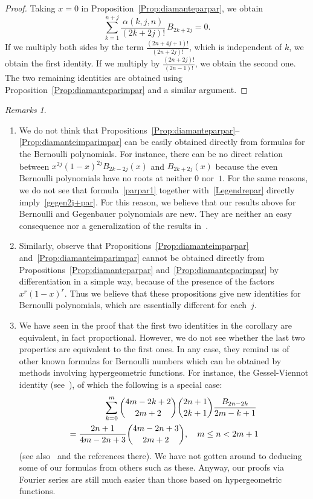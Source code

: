 \documentclass[a4paper,reqno]{amsart}
\theoremstyle{plain}
\numberwithin{equation}{section}
\theoremstyle{remark}
\newtheorem*{Notas}{Remarks}
\begin{document}
\begin{proof}
Taking $x = 0$ in Proposition~\ref{Prop:diamanteparpar}, we obtain
\[
  \sum_{k=1}^{n+j} \frac{\alpha(k,j,n)}{(2k+2j)!}\,B_{2k+2j} = 0.
\]
If we multiply both sides by the term $\frac{(2n+4j+1)!}{(2n+2j)!}$, which is independent of $k$, 
we obtain the first identity. If we multiply by $\frac{(2n+2j)!}{(2n-1)!}$, we obtain the second one. The two remaining identities are obtained using Proposition~\ref{Prop:diamanteparimpar} and a similar argument.
\end{proof}

\begin{Notas}\quad
\begin{enumerate}
\item[(i)] We do not think that Propositions~\ref{Prop:diamanteparpar}--\ref{Prop:diamanteimparimpar} can be easily obtained directly from formulas for the Bernoulli polynomials. For instance, there can be no direct relation between $x^{2j} (1-x)^{2j} B_{2k-2j}(x)$ and $B_{2k+2j}(x)$ because the even Bernoulli polynomials have no roots at neither $0$ nor~$1$. For the same reasons, we do not see that formula~\eqref{parpar1} together with~\eqref{Legendrepar} directly imply~\eqref{gegen2j+par}. For this reason, we believe that our results above for Bernoulli and Gegenbauer polynomials are new. They are neither an easy consequence nor a generalization of the results in~\cite{VuNg-Z,VuNg-B}.

\item[(ii)] Similarly, observe that Propositions~\ref{Prop:diamanteimparpar} and~\ref{Prop:diamanteimparimpar} cannot be obtained directly from Propositions~\ref{Prop:diamanteparpar} and~\ref{Prop:diamanteparimpar} by differentiation in a simple way, because of the presence of the factors $x^r (1-x)^r$. Thus we believe that these propositions give new identities for Bernoulli polynomials, which are essentially different for each~$j$.

\item[(iii)] We have seen in the proof that the first two identities in the corollary are equivalent, in fact proportional. However, we do not see whether the last two properties are equivalent to the first ones. In any case, they remind us of other known formulas for Bernoulli numbers which can be obtained by methods involving hypergeometric functions. For instance, the Gessel-Viennot identity (see~\cite{GesVien}), of which the following is a special case:
\begin{multline*}
\qquad\qquad
  \sum_{k=0}^{m} \dbinom{4m-2k+2}{2m+2} \dbinom{2n+1}{2k+1} \frac{B_{2n-2k}}{2m-k+1}
  \\*
  = \frac{2n+1}{4m-2n+3} \dbinom{4m-2n+3}{2m+2},
  \quad m\leq n<2m+1
\end{multline*}
(see also~\cite{LiLu} and the references there). We have not gotten around to deducing some of our formulas from others such as these. Anyway, our proofs via Fourier series are still much easier than those based on hypergeometric functions.
\end{enumerate}
\end{Notas}
\end{document}
